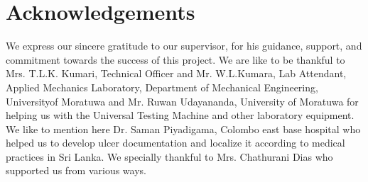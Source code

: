 \chapter*{Acknowledgements}

\vspace{10mm}
We express our sincere gratitude to our supervisor, \supervisorA \space for his guidance, support, and commitment towards the success of this project. We are like to be thankful to Mrs. T.L.K. Kumari, Technical Officer and Mr. W.L.Kumara, Lab Attendant, Applied Mechanics Laboratory, Department of Mechanical Engineering, Universityof Moratuwa and Mr. Ruwan Udayananda, University of Moratuwa for helping us with the Universal Testing Machine and other laboratory equipment. We like to mention here Dr. Saman Piyadigama, Colombo east base hospital who helped us to develop ulcer documentation and localize it according to medical practices in Sri Lanka. We specially thankful to Mrs. Chathurani Dias who supported us from various ways. 
